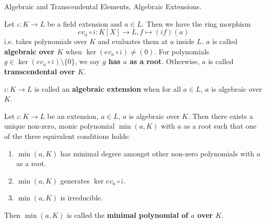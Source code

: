 \documentclass[../book.tex]{subfiles}
\begin{document}
\begin{dfn} Algebraic and Transcendental Elements, Algebraic Extensions.

    Let $\iota : K \to L$ be a field extension and $a \in L$. 
    Then we have the ring morphism \[
        ev_a \circ \bar\iota : K[X] \to L, 
        f \mapsto (\bar\iota f)(a) 
    \]
    i.e. takes polynomials over $K$ and evaluates them at $a$ inside $L$.
    $a$ is called \textbf{algebraic over $K$} when 
    $\ker (ev_a \circ \bar\iota) \neq (0)$.
    For polynomials $g \in \ker (ev_a \circ \bar\iota)\setminus \{0\}$, 
    we say \textbf{$g$ has $a$ as a root}. 
    Otherwise, $a$ is called \textbf{transcendental over $K$}. 
    
    $\iota : K \to L$ is called an \textbf{algebraic extension}
    when for all $a \in L$, $a$ is algebraic over $K$.
\end{dfn}
\begin{dfn}
Let $\iota : K \to L$ be an extension, $a \in L$, $a$ is algebraic over $K$. 
Then there exists a unique non-zero, monic polynomial $\min(a,K)$ 
with $a$ as a root such that one of the three equivalent conditions holds:
\begin{enumerate}
    \item $\min(a,K)$ has minimal degree amongst other 
        non-zero polynomials with $a$ as a root.
    \item $\min(a,K)$ generates $\ker ev_{a} \circ \bar{\iota}$. 
    \item $\min(a,K)$ is irreducible. 
\end{enumerate}
Then $\min(a,K)$ is called the \textbf{minimal polynomial of $a$ over $K$}. 
\end{dfn}
\end{document}
